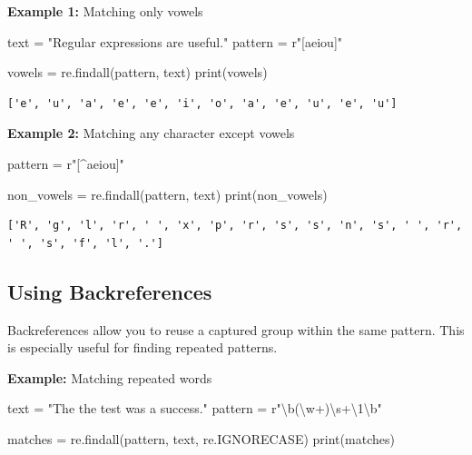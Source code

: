 \documentclass[
  letterpaper,
  DIV=11,
  numbers=noendperiod]{scrreprt}
\newenvironment{Shaded}{\begin{snugshade}}{\end{snugshade}}
\newcommand{\BuiltInTok}[1]{\textcolor[rgb]{0.00,0.23,0.31}{#1}}
\newcommand{\NormalTok}[1]{\textcolor[rgb]{0.00,0.23,0.31}{#1}}
\newcommand{\OperatorTok}[1]{\textcolor[rgb]{0.37,0.37,0.37}{#1}}
\newcommand{\StringTok}[1]{\textcolor[rgb]{0.13,0.47,0.30}{#1}}
\newcommand{\VerbatimStringTok}[1]{\textcolor[rgb]{0.13,0.47,0.30}{#1}}
\begin{document}
\textbf{Example 1:} Matching only vowels

\begin{Shaded}
\begin{Highlighting}[]
\NormalTok{text }\OperatorTok{=} \StringTok{"Regular expressions are useful."}
\NormalTok{pattern }\OperatorTok{=} \VerbatimStringTok{r"[aeiou]"}

\NormalTok{vowels }\OperatorTok{=}\NormalTok{ re.findall(pattern, text)}
\BuiltInTok{print}\NormalTok{(vowels)  }
\end{Highlighting}
\end{Shaded}

\begin{verbatim}
['e', 'u', 'a', 'e', 'e', 'i', 'o', 'a', 'e', 'u', 'e', 'u']
\end{verbatim}

\textbf{Example 2:} Matching any character except vowels

\begin{Shaded}
\begin{Highlighting}[]
\NormalTok{pattern }\OperatorTok{=} \VerbatimStringTok{r"[\^{}aeiou]"}

\NormalTok{non\_vowels }\OperatorTok{=}\NormalTok{ re.findall(pattern, text)}
\BuiltInTok{print}\NormalTok{(non\_vowels)  }
\end{Highlighting}
\end{Shaded}

\begin{verbatim}
['R', 'g', 'l', 'r', ' ', 'x', 'p', 'r', 's', 's', 'n', 's', ' ', 'r', ' ', 's', 'f', 'l', '.']
\end{verbatim}

\hypertarget{using-backreferences}{%
\subsection{Using Backreferences}\label{using-backreferences}}

Backreferences allow you to reuse a captured group within the same
pattern. This is especially useful for finding repeated patterns.

\textbf{Example:} Matching repeated words

\begin{Shaded}
\begin{Highlighting}[]
\NormalTok{text }\OperatorTok{=} \StringTok{"The the test was a success."}
\NormalTok{pattern }\OperatorTok{=} \VerbatimStringTok{r"\textbackslash{}b(\textbackslash{}w+)\textbackslash{}s+\textbackslash{}1\textbackslash{}b"}

\NormalTok{matches }\OperatorTok{=}\NormalTok{ re.findall(pattern, text, re.IGNORECASE)}
\BuiltInTok{print}\NormalTok{(matches)  }
\end{Highlighting}
\end{Shaded}
\end{document}
